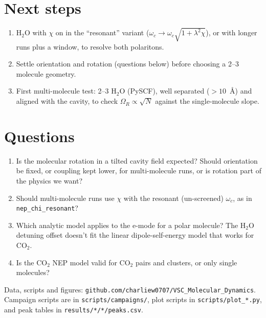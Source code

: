 \documentclass[11pt]{article}
\begin{document}
\section*{Next steps}

\begin{enumerate}
  \item H$_2$O with $\chi$ on in the ``resonant'' variant
        ($\omega_c \to \omega_c\sqrt{1+\lambda^2\chi}$), or with longer runs plus a
        window, to resolve both polaritons.
  \item Settle orientation and rotation (questions below) before choosing a 2--3 molecule
        geometry.
  \item First multi-molecule test: 2--3 H$_2$O (PySCF), well separated ($>10$~\AA) and
        aligned with the cavity, to check $\Omega_R \propto \sqrt{N}$ against the
        single-molecule slope.
\end{enumerate}

\section*{Questions}

\begin{enumerate}
  \item Is the molecular rotation in a tilted cavity field expected? Should orientation
        be fixed, or coupling kept lower, for multi-molecule runs, or is rotation part of
        the physics we want?
  \item Should multi-molecule runs use $\chi$ with the resonant (un-screened)
        $\omega_c$, as in \texttt{nep\_chi\_resonant}?
  \item Which analytic model applies to the e-mode for a polar molecule? The H$_2$O
        detuning offset doesn't fit the linear dipole-self-energy model that works for CO$_2$.
  \item Is the CO$_2$ NEP model valid for CO$_2$ pairs and clusters, or only single molecules?
\end{enumerate}

\vfill
{\small Data, scripts and figures: \texttt{github.com/charliew0707/VSC\_Molecular\_Dynamics}.
Campaign scripts are in \texttt{scripts/campaigns/}, plot scripts in \texttt{scripts/plot\_*.py},
and peak tables in \texttt{results/*/*/peaks.csv}.}
\end{document}
